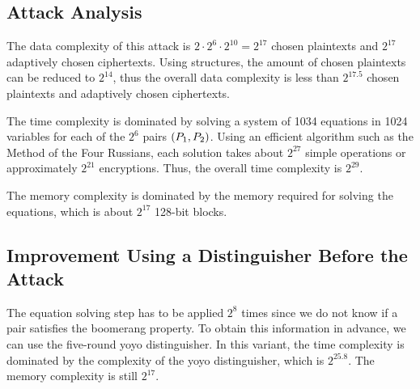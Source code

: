 \documentclass[notheorems]{beamer}
\theoremstyle{definition}
\theoremstyle{example}
\begin{document}
    \subsection{Attack Analysis}
    The data complexity of this attack is \(2 \cdot 2^6 \cdot 2^{10} = 2^{17}\)
    chosen plaintexts and \(2^{17}\) adaptively chosen ciphertexts. Using
    structures, the amount of chosen plaintexts can be reduced to \(2^{14}\), thus
    the overall data complexity is less than \(2^{17.5}\) chosen plaintexts and
    adaptively chosen ciphertexts.

    The time complexity is dominated by solving a system of 1034 equations in 1024
    variables for each of the \(2^6\) pairs \((P_1, P_2)\). Using an efficient
    algorithm such as the Method of the Four Russians, each solution takes about
    \(2^{27}\) simple operations or approximately \(2^{21}\) encryptions. Thus, the
    overall time complexity is \(2^{29}\).

    The memory complexity is dominated by the memory required for solving the
    equations, which is about \(2^{17}\) 128-bit blocks.

    \subsection{Improvement Using a Distinguisher Before the Attack}

    The equation solving step has to be applied \(2^8\) times since we do not know
    if a pair satisfies the boomerang property. To obtain this information in
    advance, we can use the five-round yoyo distinguisher. In this variant, the time
    complexity is dominated by the complexity of the yoyo distinguisher, which is
    \(2^{25.8}\). The memory complexity is still \(2^{17}\).
\end{document}
